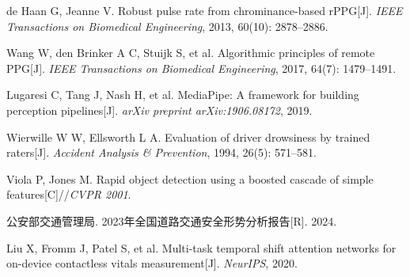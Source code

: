\documentclass[a4paper,12pt]{article}
\begin{document}
\noindent[1] de Haan G, Jeanne V. Robust pulse rate from chrominance-based rPPG[J].
\textit{IEEE Transactions on Biomedical Engineering}, 2013, 60(10): 2878--2886.

\noindent[2] Wang W, den Brinker A C, Stuijk S, et al. Algorithmic principles of
remote PPG[J]. \textit{IEEE Transactions on Biomedical Engineering}, 2017,
64(7): 1479--1491.

\noindent[3] Lugaresi C, Tang J, Nash H, et al. MediaPipe: A framework for building
perception pipelines[J]. \textit{arXiv preprint arXiv:1906.08172}, 2019.

\noindent[4] Wierwille W W, Ellsworth L A. Evaluation of driver drowsiness by trained
raters[J]. \textit{Accident Analysis \& Prevention}, 1994, 26(5): 571--581.

\noindent[5] Viola P, Jones M. Rapid object detection using a boosted cascade of
simple features[C]//\textit{CVPR 2001}.

\noindent[6] 公安部交通管理局. 2023年全国道路交通安全形势分析报告[R]. 2024.

\noindent[7] Liu X, Fromm J, Patel S, et al. Multi-task temporal shift attention networks
for on-device contactless vitals measurement[J]. \textit{NeurIPS}, 2020.
\end{document}
